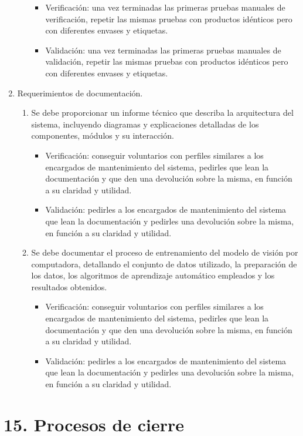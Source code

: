 \documentclass[
11pt, %
]{charter}
\begin{document}
\begin{enumerate}
\begin{enumerate}
			\begin{itemize}
		\item Verificación: una vez terminadas las primeras pruebas manuales de verificación, repetir las mismas pruebas con productos idénticos pero con diferentes envases y etiquetas.
	\item Validación: una vez terminadas las primeras pruebas manuales de validación, repetir las mismas pruebas con productos idénticos pero con diferentes envases y etiquetas. 
\end{itemize}	
\end{enumerate}
\item Requerimientos de documentación.
\begin{enumerate}
\item Se debe proporcionar un informe técnico que describa la arquitectura del sistema, incluyendo diagramas y explicaciones detalladas de los componentes, módulos y su interacción.
			\begin{itemize}
	\item Verificación: conseguir voluntarios con perfiles similares a los encargados de mantenimiento del sistema, pedirles que lean la documentación y que den una devolución sobre la misma, en función a su claridad y utilidad.
	\item Validación: pedirles a los encargados de mantenimiento del sistema que lean la documentación y pedirles una devolución sobre la misma, en función a su claridad y utilidad.
\end{itemize}
			\item Se debe documentar el proceso de entrenamiento del modelo de visión por computadora, detallando el conjunto de datos utilizado, la preparación de los datos, los algoritmos de aprendizaje automático empleados y los resultados obtenidos.
			\begin{itemize}
	\item Verificación: conseguir voluntarios con perfiles similares a los encargados de mantenimiento del sistema, pedirles que lean la documentación y que den una devolución sobre la misma, en función a su claridad y utilidad.
	\item Validación: pedirles a los encargados de mantenimiento del sistema que lean la documentación y pedirles una devolución sobre la misma, en función a su claridad y utilidad.
\end{itemize}
\end{enumerate}
\end{enumerate}

\section{15. Procesos de cierre}    
\label{sec:cierre}
\end{document}
